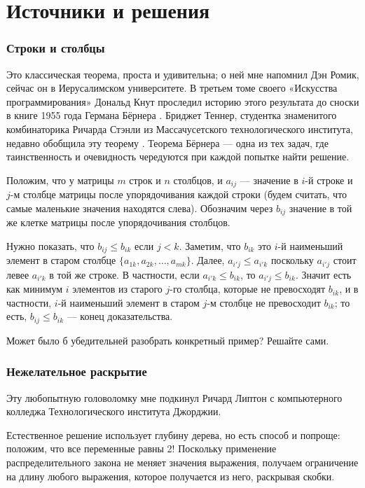 \section*{Источники и решения}

\subsubsection*{Строки и столбцы}

Это классическая теорема, проста и удивительна; о ней мне напомнил Дэн Ромик, сейчас он в Иерусалимском университете.
В третьем томе своего «Искусства программирования» \cite{41} Дональд Кнут проследил историю этого результата до сноски в книге 1955 года Германа Бёрнера \cite{7}.
Бриджет Теннер, студентка знаменитого комбинаторика Ричарда Стэнли из Массачусетского технологического института, недавно обобщила эту теорему \cite{57}.
Теорема Бёрнера --- одна из тех задач, где таинственность и очевидность чередуются при каждой попытке найти решение.

Положим, что у матрицы $m$ строк и $n$ столбцов, и $a_{ij}$ --- значение в $i$-й строке и $j$-м столбце матрицы
после упорядочивания каждой строки (будем считать, что самые маленькие значения находятся слева).
Обозначим через $b_{ij}$ значение в той же клетке матрицы после упорядочивания столбцов.

Нужно показать, что $b_{ij} \le b_{ik}$ если $j < k$.
Заметим, что $b_{ik}$ это $i$-й наименьший элемент в старом столбце $\{a_{1k}, a_{2k}, \dots, a_{mk}\}$.
Далее, $a_{i'j}\le a_{i'k}$ поскольку $a_{i'j}$ стоит левее $a_{i'k}$ в той же строке.
В частности, если $a_{i'k}\le b_{ik}$, то $a_{i'j}\le b_{ik}$.
Значит есть как минимум $i$ элементов из старого $j$-го столбца, которые не превосходят $b_{ik}$,
и в частности, $i$-й наименьший элемент в старом $j$-м столбце не превосходит $b_{ik}$;
то есть, $b_{ij} \le b_{ik}$ --- конец доказательства.

Может было б убедительней разобрать конкретный пример?
Решайте сами.

\subsubsection*{Нежелательное раскрытие}

Эту любопытную головоломку мне подкинул Ричард Липтон с компьютерного колледжа Технологического института Джорджии.

Естественное решение использует глубину дерева, но есть способ и попроще:
положим, что все переменные равны 2!
Поскольку применение распределительного закона не меняет значения выражения, получаем ограничение на длину любого выражения, которое получается из него, раскрывая скобки.

